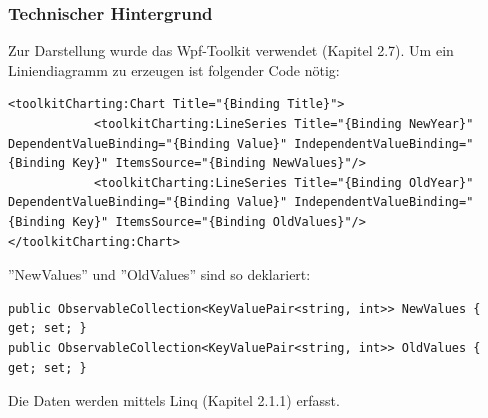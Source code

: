 \subsubsection{Technischer Hintergrund}
Zur Darstellung wurde das Wpf-Toolkit verwendet (Kapitel 2.7). \newline
Um ein Liniendiagramm zu erzeugen ist folgender Code nötig:
\begin{lstlisting}
<toolkitCharting:Chart Title="{Binding Title}">
            <toolkitCharting:LineSeries Title="{Binding NewYear}"  DependentValueBinding="{Binding Value}" IndependentValueBinding="{Binding Key}" ItemsSource="{Binding NewValues}"/>
            <toolkitCharting:LineSeries Title="{Binding OldYear}"  DependentValueBinding="{Binding Value}" IndependentValueBinding="{Binding Key}" ItemsSource="{Binding OldValues}"/>
</toolkitCharting:Chart>
\end{lstlisting}
''NewValues'' und ''OldValues'' sind so deklariert: 
\begin{lstlisting}
public ObservableCollection<KeyValuePair<string, int>> NewValues { get; set; }
public ObservableCollection<KeyValuePair<string, int>> OldValues { get; set; }
\end{lstlisting}
Die Daten werden mittels Linq (Kapitel 2.1.1) erfasst.
